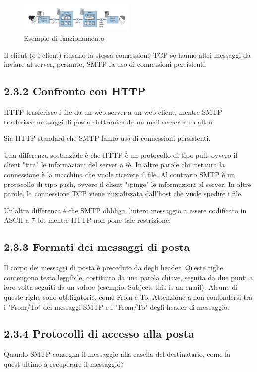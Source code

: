 \documentclass{book}
\begin{document}
\begin{figure}[h]
	\centering
	\includegraphics[width=0.5\textwidth]{images/SMTP_example.png}
	\caption{Esempio di funzionamento}
	\label{fig:esempio}
\end{figure}

Il client (o i client) riusano la stessa connessione TCP se hanno altri messaggi da inviare al server, pertanto, SMTP fa uso di connessioni persistenti.

\subsection*{2.3.2 Confronto con HTTP}
HTTP trasferisce i file da un web server a un web client, mentre SMTP trasferisce messaggi di posta elettronica da un mail server a un altro.

Sia HTTP standard che SMTP fanno uso di connessioni persistenti.

Una differenza sostanziale è che HTTP è un protocollo di tipo pull, ovvero il client "tira" le informazioni del server a sè. In altre parole chi instaura la connessione è la macchina che vuole ricevere il file. Al contrario SMTP è un protocollo di tipo push, ovvero il client "spinge" le informazioni al server. In altre parole, la connessione TCP viene inizializzata dall'host che vuole spedire i file.

Un'altra differenza è che SMTP obbliga l'intero messaggio a essere codificato in ASCII a 7 bit mentre HTTP non pone tale restrizione.

\subsection*{2.3.3 Formati dei messaggi di posta}
Il corpo dei messaggi di posta è preceduto da degli header.
Queste righe contengono testo leggibile, costituito da una parola chiave, seguita da due punti a loro volta seguiti da un valore (esempio: Subject: this is an email). Alcune di queste righe sono obbligatorie, come From e To. Attenzione a non confondersi tra i "From/To" dei messaggi SMTP e i "From/To" degli header di messaggio.

\subsection*{2.3.4 Protocolli di accesso alla posta}
Quando SMTP consegna il messaggio alla casella del destinatario, come fa quest'ultimo a recuperare il messaggio? 
\end{document}

